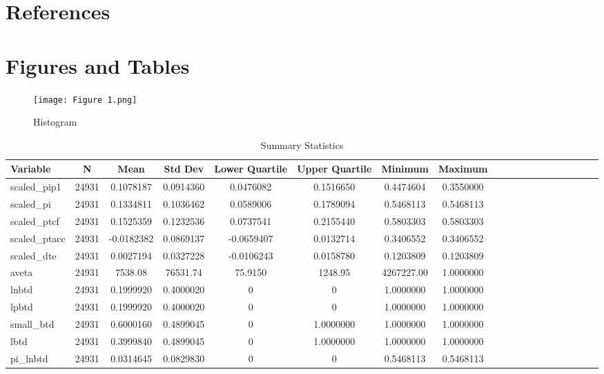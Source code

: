 \documentclass[12pt]{article}
\begin{document}
\newpage

\section{References}


\newpage

\section{Figures and Tables}

\begin{figure}[htbp]
    \centering
    \texttt{[image: Figure 1.png]}
    \caption{Histogram}
\end{figure}

\begin{table}[htbp]
\centering
\caption{Summary Statistics}
\label{tab:summary_statistics}
\begin{adjustbox}{max width=\textwidth}
\begin{tabular}{|l|c|c|c|c|c|c|c|c|c|c|c|c|c|c|c|c|c|c|}
\hline
Variable & N & Mean & Std Dev & Lower Quartile & Upper Quartile & Minimum & Maximum \\
\hline
scaled\_pip1 & 24931 & 0.1078187 & 0.0914360 & 0.0476082 & 0.1516650 & 0.4474604 & 0.3550000 \\
scaled\_pi & 24931 & 0.1334811 & 0.1036462 & 0.0589006 & 0.1789094 & 0.5468113 & 0.5468113 \\
scaled\_ptcf & 24931 & 0.1525359 & 0.1232536 & 0.0737541 & 0.2155440 & 0.5803303 & 0.5803303 \\
scaled\_ptacc & 24931 & -0.0182382 & 0.0869137 & -0.0659407 & 0.0132714 & 0.3406552 & 0.3406552 \\
scaled\_dte & 24931 & 0.0027194 & 0.0327228 & -0.0106243 & 0.0158780 & 0.1203809 & 0.1203809 \\
aveta & 24931 & 7538.08 & 76531.74 & 75.9150 & 1248.95 & 4267227.00 & 1.0000000 \\
lnbtd & 24931 & 0.1999920 & 0.4000020 & 0 & 0 & 1.0000000 & 1.0000000 \\
lpbtd & 24931 & 0.1999920 & 0.4000020 & 0 & 0 & 1.0000000 & 1.0000000 \\
small\_btd & 24931 & 0.6000160 & 0.4899045 & 0 & 1.0000000 & 1.0000000 & 1.0000000 \\
lbtd & 24931 & 0.3999840 & 0.4899045 & 0 & 1.0000000 & 1.0000000 & 1.0000000 \\
pi\_lnbtd & 24931 & 0.0314645 & 0.0829830 & 0 & 0 & 0.5468113 & 0.5468113 \\

\end{tabular}
\end{adjustbox}
\end{table}
\end{document}
